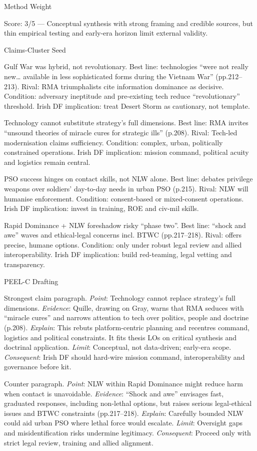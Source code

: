 Method Weight

Score: 3/5 — Conceptual synthesis with strong framing and credible sources, but thin empirical testing and early-era horizon limit external validity.

Claims-Cluster Seed

Gulf War was hybrid, not revolutionary. Best line: technologies “were not really new… available in less sophisticated forms during the Vietnam War” (pp.212–213). Rival: RMA triumphalists cite information dominance as decisive. Condition: adversary ineptitude and pre-existing tech reduce “revolutionary” threshold. Irish DF implication: treat Desert Storm as cautionary, not template.

Technology cannot substitute strategy’s full dimensions. Best line: RMA invites “unsound theories of miracle cures for strategic ills” (p.208). Rival: Tech-led modernisation claims sufficiency. Condition: complex, urban, politically constrained operations. Irish DF implication: mission command, political acuity and logistics remain central.

PSO success hinges on contact skills, not NLW alone. Best line: debates privilege weapons over soldiers’ day-to-day needs in urban PSO (p.215). Rival: NLW will humanise enforcement. Condition: consent-based or mixed-consent operations. Irish DF implication: invest in training, ROE and civ-mil skills.

Rapid Dominance + NLW foreshadow risky “phase two”. Best line: “shock and awe” waves and ethical-legal concerns incl. BTWC (pp.217–218). Rival: offers precise, humane options. Condition: only under robust legal review and allied interoperability. Irish DF implication: build red-teaming, legal vetting and transparency.

PEEL-C Drafting

Strongest claim paragraph.
\textit{Point}: Technology cannot replace strategy’s full dimensions.
\textit{Evidence}: Quille, drawing on Gray, warns that RMA seduces with “miracle cures” and narrows attention to tech over politics, people and doctrine (p.208).
\textit{Explain}: This rebuts platform-centric planning and recentres command, logistics and political constraints. It fits thesis LOs on critical synthesis and doctrinal application.
\textit{Limit}: Conceptual, not data-driven; early-era scope.
\textit{Consequent}: Irish DF should hard-wire mission command, interoperability and governance before kit.

Counter paragraph.
\textit{Point}: NLW within Rapid Dominance might reduce harm when contact is unavoidable.
\textit{Evidence}: “Shock and awe” envisages fast, graduated responses, including non-lethal options, but raises serious legal-ethical issues and BTWC constraints (pp.217–218).
\textit{Explain}: Carefully bounded NLW could aid urban PSO where lethal force would escalate.
\textit{Limit}: Oversight gaps and misidentification risks undermine legitimacy.
\textit{Consequent}: Proceed only with strict legal review, training and allied alignment.

